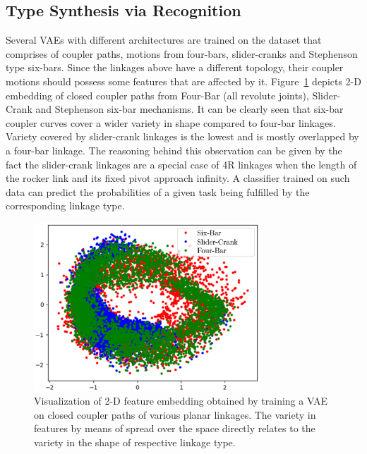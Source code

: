 \subsection{Type Synthesis via Recognition}
Several VAEs with different architectures are trained on the dataset that comprises of coupler paths, motions from four-bars, slider-cranks and Stephenson type six-bars.
Since the linkages above have a different topology, their coupler motions should possess some features that are affected by it.
Figure~\ref{fig_classifier} depicts 2-D embedding of closed coupler paths from Four-Bar (all revolute joints), Slider-Crank and Stephenson six-bar mechanisms.
It can be clearly seen that six-bar coupler curves cover a wider variety in shape compared to four-bar linkages.
Variety covered by slider-crank linkages is the lowest and is mostly overlapped by a four-bar linkage.
The reasoning behind this observation can be given by the fact the slider-crank linkages are a special case of 4R linkages when the length of the rocker link and its fixed pivot approach infinity.
A classifier trained on such data can predict the probabilities of a given task being fulfilled by the corresponding linkage type.
\begin{figure}
\centering
\includegraphics[width=240pt]{jmd-19/figure/fig_classifier.eps}
  \caption{Visualization of 2-D feature embedding obtained by training a VAE on closed coupler paths of various planar linkages. The variety in features by means of spread over the space directly relates to the variety in the shape of respective linkage type.}
\label{fig_classifier}
\end{figure}


